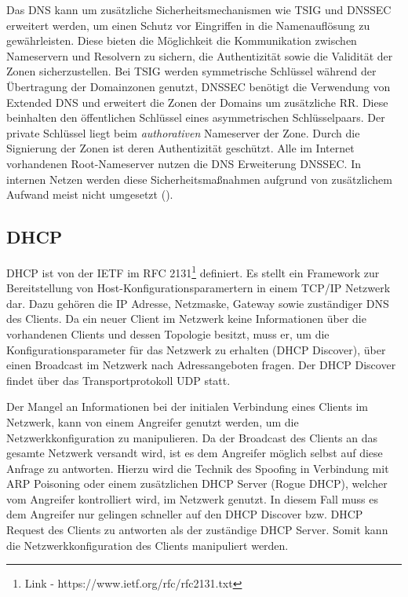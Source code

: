 Das \ac{DNS} kann um zusätzliche Sicherheitsmechanismen wie \ac{TSIG} und \ac{DNSSEC} erweitert werden, um einen Schutz vor Eingriffen in die Namenauflösung zu gewährleisten. Diese bieten die Möglichkeit die Kommunikation zwischen Nameservern und Resolvern zu sichern, die Authentizität sowie die Validität der Zonen sicherzustellen. Bei \ac{TSIG} werden symmetrische Schlüssel während der Übertragung der Domainzonen genutzt, \ac{DNSSEC} benötigt die Verwendung von Extended \ac{DNS} und erweitert die Zonen der Domains um zusätzliche \ac{RR}. Diese beinhalten den öffentlichen Schlüssel eines asymmetrischen Schlüsselpaars. Der private Schlüssel liegt beim \textit{authorativen} Nameserver der Zone. Durch die Signierung der Zonen ist deren Authentizität geschützt. Alle im Internet vorhandenen Root-Nameserver nutzen die \ac{DNS} Erweiterung \ac{DNSSEC}. In internen Netzen werden diese Sicherheitsmaßnahmen aufgrund von zusätzlichem Aufwand meist nicht umgesetzt (\cite{Ledermueller2009}).

\subsection{\ac{DHCP}}
\label{Analyse:DHCP}
\ac{DHCP} ist von der \ac{IETF} im \ac{RFC} 2131\footnote{Link - https://www.ietf.org/rfc/rfc2131.txt} definiert. Es stellt ein Framework zur Bereitstellung von Host-Konfigurationsparamertern in einem \ac{TCP}/\ac{IP} Netzwerk dar. Dazu gehören die \ac{IP} Adresse, Netzmaske, Gateway sowie zuständiger \ac{DNS} des Clients. Da ein neuer Client im Netzwerk keine Informationen über die vorhandenen Clients und dessen Topologie besitzt, muss er, um die Konfigurationsparameter für das Netzwerk zu erhalten (\ac{DHCP} Discover), über einen Broadcast im Netzwerk nach Adressangeboten fragen. Der \ac{DHCP} Discover findet über das Transportprotokoll \ac{UDP} statt.

Der Mangel an Informationen bei der initialen Verbindung eines Clients im Netzwerk, kann von einem Angreifer genutzt werden, um die Netzwerkkonfiguration zu manipulieren. Da der Broadcast des Clients an das gesamte Netzwerk versandt wird, ist es dem Angreifer möglich selbst auf diese Anfrage zu antworten. Hierzu wird die Technik des Spoofing in Verbindung mit \ac{ARP} Poisoning oder einem zusätzlichen \ac{DHCP} Server (Rogue \ac{DHCP}), welcher vom Angreifer kontrolliert wird, im Netzwerk genutzt. In diesem Fall muss es dem Angreifer nur gelingen schneller auf den \ac{DHCP} Discover bzw. \ac{DHCP} Request des Clients zu antworten als der zuständige \ac{DHCP} Server. Somit kann die Netzwerkkonfiguration des Clients manipuliert werden.

